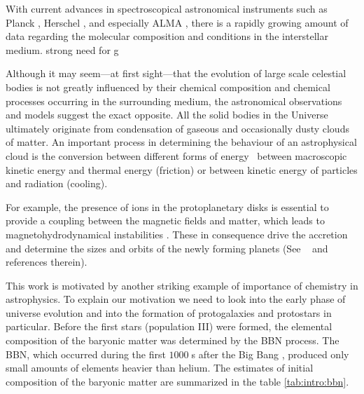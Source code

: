 With current advances in spectroscopical astronomical instruments such
as Planck \citep{planck2011}, Herschel \citep{herschel2010},
and especially ALMA \citep{semenov2008}, there is a rapidly growing
amount of data
regarding the molecular composition and conditions in the interstellar
medium. strong need for
g

Although it may seem---at first sight---that the evolution of large scale
celestial bodies is not greatly influenced by their chemical
composition and chemical processes occurring in the surrounding medium,
the astronomical observations and models suggest the exact opposite.
All the solid bodies in the Universe ultimately originate from
condensation of gaseous and occasionally dusty clouds of matter. An
important process in determining the behaviour of an astrophysical
cloud is the conversion between different forms of energy \eg\ between
macroscopic kinetic energy and thermal energy (friction) or between
kinetic energy of particles and radiation (cooling).

For example, the presence of ions in the protoplanetary disks is essential
to provide a coupling between the magnetic fields and matter, which leads
to magnetohydrodynamical instabilities \citep{balbus1991}. These in
consequence drive the
accretion and determine the sizes and orbits of the newly forming planets
(See \eg\ \cite{wardle2007,semenov2008} and references therein).

This work is motivated by another striking example of importance of chemistry
in astrophysics. To explain our motivation we need to look into the early phase
of universe evolution and into the formation of protogalaxies and
protostars in particular. Before the first stars (population III) were formed,
the elemental composition of the baryonic matter was determined by the \ac{BBN}
process.
The \ac{BBN}, which occurred during the first $1000\;$s after the Big Bang
\citep{walker1991}, produced
only small amounts of elements heavier than helium. The estimates of initial
composition of the baryonic matter are summarized in the table
\ref{tab:intro:bbn}.
\begin{table}
    \caption{Measured abundances of the elements after the Big Bang
    nucleosynthesis \citep{yao2006}. The primordial density of ${}^3$He has
    not been determined from observations, but the observations of more recent
    astronomical objects and models suggest a value of the order
    $10^{-5}$ \citep{balser1999}. Other elements are expected to be present at
    relative concentrations below $10^{-10}$ \citep{vangioni2000}.}
    \label{tab:intro:bbn}
\end{table}


